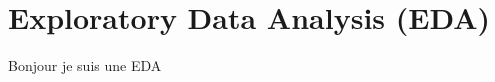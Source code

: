 \thispagestyle{plain}

\chapter{Exploratory Data Analysis (EDA)}
\label{cp:eda}
\vspace{1\baselineskip}



Bonjour je suis une EDA